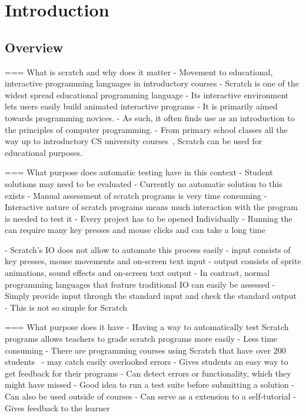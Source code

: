 
\chapter{Introduction}

\section{Overview}
=== What is scratch and why does it matter
- Movement to educational, interactive programming languages in introductory courses
- Scratch is one of the widest spread educational programming language
- Its interactive environment lets users easily build animated interactive programs
- It is primarily aimed towards programming novices.
- As such, it often finds use as an introduction to the principles of computer programming.
- From primary school classes all the way up to introductory CS university courses~\cite{itch, hairball}, Scratch can be used for educational purposes.

=== What purpose does automatic testing have in this context
- Student solutions may need to be evaluated
- Currently no automatic solution to this exists
- Manual assessment of scratch programs is very time consuming
- Interactive nature of scratch programs means much interaction with the program is needed to test it
- Every project has to be opened Individually
- Running the can require many key presses and mouse clicks and can take a long time

- Scratch's IO does not allow to automate this process easily
    - input consists of key presses, mouse movements and on-screen text input
    - output consists of sprite animations, sound effects and on-screen text output
- In contrast, normal programming languages that feature traditional IO can easily be assessed
- Simply provide input through the standard input and check the standard output
- This is not so simple for Scratch

=== What purpose does it have
- Having a way to automatically test Scratch programs allows teachers to grade scratch programs more easily
    - Less time consuming
        - There are programming courses using Scratch that have over 200 students~\cite{itch}
    - may catch easily overlooked errors
    - Gives students an easy way to get feedback for their programs
        - Can detect errors or functionality, which they might have missed
        - Good idea to run a test suite before submitting a solution
- Can also be used outside of courses
    - Can serve as a extension to a self-tutorial
    - Gives feedback to the learner

